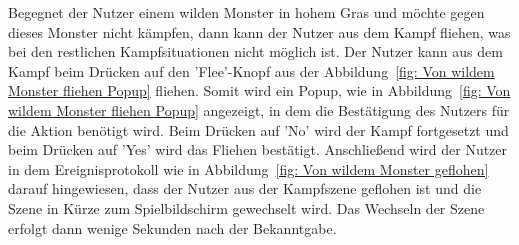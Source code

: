 Begegnet der Nutzer einem wilden Monster in hohem Gras und möchte gegen dieses Monster nicht kämpfen, dann kann der Nutzer aus dem Kampf fliehen, was bei den restlichen Kampfsituationen nicht möglich ist.
Der Nutzer kann aus dem Kampf beim Drücken auf den 'Flee'-Knopf aus der Abbildung~\ref{fig: Von wildem Monster fliehen Popup} fliehen. Somit wird ein Popup, wie in Abbildung~\ref{fig: Von wildem Monster fliehen Popup} angezeigt, in dem die Bestätigung des Nutzers für die Aktion benötigt wird.
Beim Drücken auf 'No' wird der Kampf fortgesetzt und beim Drücken auf 'Yes' wird das Fliehen bestätigt.
Anschließend wird der Nutzer in dem Ereignisprotokoll wie in Abbildung~\ref{fig: Von wildem Monster geflohen} darauf hingewiesen, dass der Nutzer aus der Kampfszene geflohen ist und die Szene in Kürze zum Spielbildschirm gewechselt wird. Das Wechseln der Szene erfolgt dann wenige Sekunden nach der Bekanntgabe. 
